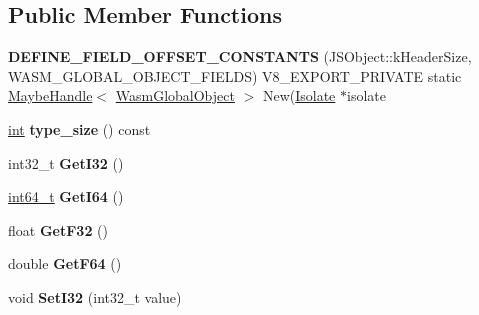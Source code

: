 \subsection*{Public Member Functions}
\begin{DoxyCompactItemize}
\item 
\mbox{\label{classv8_1_1internal_1_1WasmGlobalObject_a6c6e2ec43603db82f0ed04306bc8b32c}} 
{\bfseries D\+E\+F\+I\+N\+E\+\_\+\+F\+I\+E\+L\+D\+\_\+\+O\+F\+F\+S\+E\+T\+\_\+\+C\+O\+N\+S\+T\+A\+N\+TS} (J\+S\+Object\+::k\+Header\+Size, W\+A\+S\+M\+\_\+\+G\+L\+O\+B\+A\+L\+\_\+\+O\+B\+J\+E\+C\+T\+\_\+\+F\+I\+E\+L\+DS) V8\+\_\+\+E\+X\+P\+O\+R\+T\+\_\+\+P\+R\+I\+V\+A\+TE static \mbox{\hyperlink{classv8_1_1internal_1_1MaybeHandle}{Maybe\+Handle}}$<$ \mbox{\hyperlink{classv8_1_1internal_1_1WasmGlobalObject}{Wasm\+Global\+Object}} $>$ New(\mbox{\hyperlink{classv8_1_1internal_1_1Isolate}{Isolate}} $\ast$isolate
\item 
\mbox{\label{classv8_1_1internal_1_1WasmGlobalObject_a9edfe9ec8d5743bb3ca664cfdb54dad8}} 
\mbox{\hyperlink{classint}{int}} {\bfseries type\+\_\+size} () const
\item 
\mbox{\label{classv8_1_1internal_1_1WasmGlobalObject_a8b83813b17edd0a13c1291132cfe9cd7}} 
int32\+\_\+t {\bfseries Get\+I32} ()
\item 
\mbox{\label{classv8_1_1internal_1_1WasmGlobalObject_a58eb910481c73e5dfdd798e039d9e453}} 
\mbox{\hyperlink{classint64__t}{int64\+\_\+t}} {\bfseries Get\+I64} ()
\item 
\mbox{\label{classv8_1_1internal_1_1WasmGlobalObject_af27fae8c51ec1632b99966c3a48a2133}} 
float {\bfseries Get\+F32} ()
\item 
\mbox{\label{classv8_1_1internal_1_1WasmGlobalObject_a7609ab5ee4ce0febafe724646fe723e0}} 
double {\bfseries Get\+F64} ()
\item 
\mbox{\label{classv8_1_1internal_1_1WasmGlobalObject_a907bfae11f58b11d3880b92daaa64d0f}} 
void {\bfseries Set\+I32} (int32\+\_\+t value)

\end{DoxyCompactItemize}
